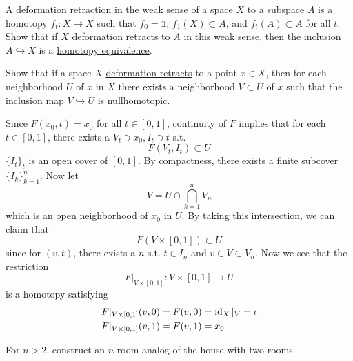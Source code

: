	\begin{exercise}[Hatcher 0.4]
		A deformation \hyperref[def:retraction]{retraction} in the weak sense of a space $X$ to a subspace $A$ is a homotopy $f_t: X \to X$ such that $f_0 = \mathbb{1}$, $f_1(X) \subset A$, and $f_t(A) \subset A$ for all $t$. Show that if $X$ \hyperref[def:deformation-retract]{deformation retracts} to $A$ in this weak sense, then the inclusion $A \hookrightarrow X$ is a \hyperref[def:homotopy-equivalence]{homotopy equivalence}.
	\end{exercise}

	\begin{exercise}[Hatcher 0.5]
		Show that if a space $X$ \hyperref[def:deformation-retract]{deformation retracts} to a point $x \in X$, then for each neighborhood $U$ of $x$ in $X$ there exists a neighborhood $V \subset U$ of $x$ such that the inclusion map $V \hookrightarrow U$ is nullhomotopic.
	\end{exercise}
	\begin{solution}
		Since $F(x_0, t) = x_0$ for all $t \in [0, 1]$, continuity of $F$ implies that for each $t \in [0, 1]$, there exists a $V_t \ni x_0, I_t \ni t$ s.t. 
		\begin{equation}
		  F(V_t, I_t) \subset U
		\end{equation}
		$\{I_t\}_{t}$ is an open cover of $[0, 1]$. By compactness, there exists a finite subcover $\{I_k\}_{k=1}^n$. Now let 
		\begin{equation}
			V = U \cap \bigcap_{k=1}^n V_n
		\end{equation}
		which is an open neighborhood of $x_0$ in $U$. By taking this intersection, we can claim that 
		\begin{equation}
			F(V \times [0, 1]) \subset U
		\end{equation}
		since for $(v, t)$, there exists a $n$ s.t. $t \in I_n$ and $v \in V \subset V_n$. Now we see that the restriction 
		\begin{equation}
			F|_{V \times [0, 1]} : V \times [0, 1] \to U
		\end{equation}
		is a homotopy satisfying 
		\begin{align}
			F|_{V \times [0, 1]} (v, 0) & = F(v, 0) = \operatorname{id}_X |_V = \iota \\ 
			F|_{V \times [0, 1]} (v, 1) & = F(v, 1) = x_0 
		\end{align}
	\end{solution}

	\begin{exercise}[Hatcher 0.8]
		For $n > 2$, construct an $n$-room analog of the house with two rooms.
	\end{exercise}

